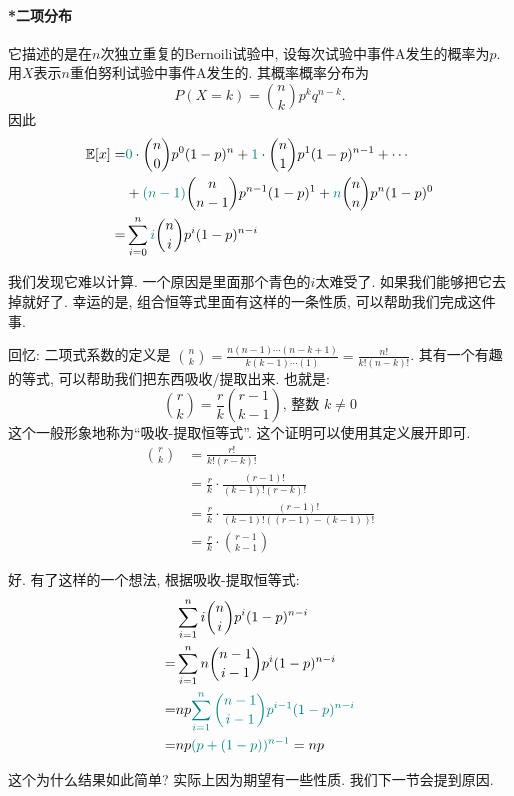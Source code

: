     \begin{shaded}
        \paragraph{*二项分布} 它描述的是在$n$次独立重复的Bernoili试验中, 设每次试验中事件A发生的概率为$p$. 用$X$表示$n$重伯努利试验中事件A发生的{}.
        其概率概率分布为$$P(X=k)={n\choose k} p^k q^{n-k}.$$
        因此
    $$
\begin{aligned}
\mathbb E[x]= & {{\color{teal}0}} \cdot {n \choose 0} p^0(1-p)^n+{{\color{teal}1}} \cdot\binom n1 p^1(1-p)^{n-1}+\cdots \\
& +{{\color{teal}(n-1)}}\binom n{n-1} p^{n-1}(1-p)^1  +{{\color{teal}n}}\binom nn
 p^n(1-p)^0 \\
= & \sum_{i=0}^n {{\color{teal}i}}\binom ni p^i(1-p)^{n-i}
\end{aligned}
$$

我们发现它难以计算. 一个原因是里面那个青色的$i$太难受了. 如果我们能够把它去掉就好了. 幸运的是, 组合恒等式里面有这样的一条性质, 可以帮助我们完成这件事. 

回忆: 二项式系数的定义是 $\binom nk = \frac{n(n-1) \cdots(n-k+1)}{k(k-1) \cdots(1)}=\frac{n !}{k !(n-k) !}$. 其有一个有趣的等式, 可以帮助我们把东西吸收/提取出来. 也就是: 
$$
\binom rk=\frac{r}{k}\binom{r-1}{k-1} \text {, 整数 } k \neq 0
$$
这个一般形象地称为``吸收-提取恒等式''. 这个证明可以使用其定义展开即可. 
$$
\begin{aligned}
\binom rk & =\frac{r !}{k !(r-k) !} \\
& =\frac{r}{k} \cdot \frac{(r-1) !}{(k-1) !(r-k) !} \\
& =\frac{r}{k} \cdot \frac{(r-1) !}{(k-1) !((r-1)-(k-1)) !} \\
& =\frac{r}{k} \cdot \binom {r-1}{k-1}
\end{aligned}
$$


好. 有了这样的一个想法,  根据吸收-提取恒等式:
$$
\begin{aligned}
& \sum_{i=1}^n i\binom ni p^i(1-p)^{n-i} \\
= & \sum_{i=1}^n n\binom{n-1}{i-1} p^i(1-p)^{n-i} \\
= & n p {{\color{teal}\sum_{i=1}^n\binom{n-1}{i-1} p^{i-1}(1-p)^{n-i}}} \\
= & n p{{\color{teal}(p+(1-p))^{n-1}}}=n p
\end{aligned}
$$

这个为什么结果如此简单? 实际上因为期望有一些性质. 我们下一节会提到原因. 
    \end{shaded}

